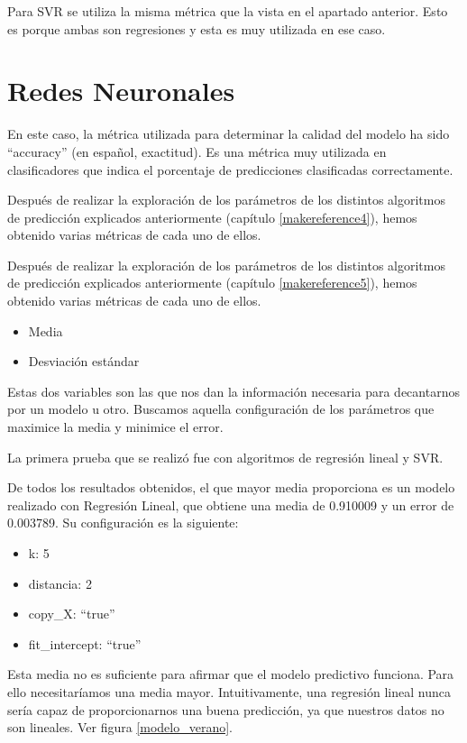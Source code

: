 Para SVR se utiliza la misma métrica que la vista en el apartado anterior. Esto es porque ambas son regresiones y esta es muy utilizada en ese caso.

\section{Redes Neuronales}
\label{makereference6.3}

En este caso, la métrica utilizada para determinar la calidad del modelo ha sido ``accuracy'' (en español, exactitud). Es una métrica muy utilizada en clasificadores que indica el porcentaje de predicciones clasificadas correctamente.

Después de realizar la exploración de los parámetros de los distintos algoritmos de predicción explicados anteriormente (capítulo \ref{makereference4}), hemos obtenido varias métricas de cada uno de ellos.

Después de realizar la exploración de los parámetros de los distintos algoritmos de predicción explicados anteriormente (capítulo \ref{makereference5}), hemos obtenido varias métricas de cada uno de ellos.

\begin{itemize}
	\item Media
	\item Desviación estándar
\end{itemize}

Estas dos variables son las que nos dan la información necesaria para decantarnos por un modelo u otro. Buscamos aquella configuración de los parámetros que maximice la media y minimice el error.

La primera prueba que se realizó fue con algoritmos de regresión lineal y SVR.

De todos los resultados obtenidos, el que mayor media proporciona es un modelo realizado con Regresión Lineal, que obtiene una media de 0.910009 y un error de 0.003789. Su configuración es la siguiente:

\begin{itemize}
	\item k: 5
	\item distancia: 2
	\item copy\_X: ``true''
	\item fit\_intercept: ``true''
\end{itemize}

Esta media no es suficiente para afirmar que el modelo predictivo funciona. Para ello necesitaríamos una media mayor. Intuitivamente, una regresión lineal nunca sería capaz de proporcionarnos una buena predicción, ya que nuestros datos no son lineales. Ver figura \ref{modelo_verano}.

